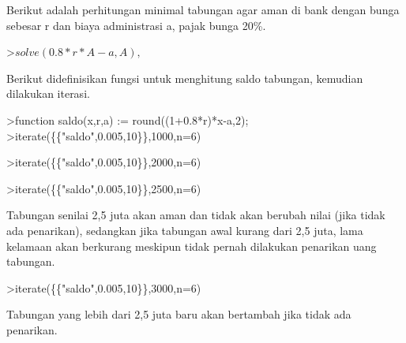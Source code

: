\documentclass[a4paper,10pt]{article}
\begin{document}
\begin{eulernotebook}
\begin{eulercomment}
\begin{eulercomment}
\begin{eulercomment}
\begin{eulercomment}
\begin{eulercomment}
\begin{eulercomment}
\begin{eulercomment}
\begin{eulercomment}
\begin{eulercomment}
\begin{eulercomment}
\begin{eulercomment}
\begin{eulercomment}
\begin{eulercomment}
\begin{eulercomment}
\begin{eulercomment}
\begin{eulercomment}
\begin{eulercomment}
Berikut adalah perhitungan minimal tabungan agar aman di bank dengan bunga sebesar r dan
biaya administrasi a, pajak bunga 20\%.
\end{eulercomment}
\begin{eulerprompt}
>$solve(0.8*r*A-a,A), $%
\end{eulerprompt}
\begin{eulercomment}
Berikut didefinisikan fungsi untuk menghitung saldo tabungan, kemudian dilakukan iterasi.
\end{eulercomment}
\begin{eulerprompt}
>function saldo(x,r,a) := round((1+0.8*r)*x-a,2);
>iterate(\{\{"saldo",0.005,10\}\},1000,n=6)
\end{eulerprompt}
\begin{euleroutput}
  [1000,  994,  987.98,  981.93,  975.86,  969.76,  963.64]
\end{euleroutput}
\begin{eulerprompt}
>iterate(\{\{"saldo",0.005,10\}\},2000,n=6)
\end{eulerprompt}
\begin{euleroutput}
  [2000,  1998,  1995.99,  1993.97,  1991.95,  1989.92,  1987.88]
\end{euleroutput}
\begin{eulerprompt}
>iterate(\{\{"saldo",0.005,10\}\},2500,n=6)
\end{eulerprompt}
\begin{euleroutput}
  [2500,  2500,  2500,  2500,  2500,  2500,  2500]
\end{euleroutput}
\begin{eulercomment}
Tabungan senilai 2,5 juta akan aman dan tidak akan berubah nilai (jika tidak ada penarikan),
sedangkan jika tabungan awal kurang dari 2,5 juta, lama kelamaan akan berkurang meskipun
tidak pernah dilakukan penarikan uang tabungan.
\end{eulercomment}
\begin{eulerprompt}
>iterate(\{\{"saldo",0.005,10\}\},3000,n=6)
\end{eulerprompt}
\begin{euleroutput}
  [3000,  3002,  3004.01,  3006.03,  3008.05,  3010.08,  3012.12]
\end{euleroutput}
\begin{eulercomment}
Tabungan yang lebih dari 2,5 juta baru akan bertambah jika tidak ada penarikan.


\end{eulercomment}
\end{eulercomment}
\end{eulercomment}
\end{eulercomment}
\end{eulercomment}
\end{eulercomment}
\end{eulercomment}
\end{eulercomment}
\end{eulercomment}
\end{eulercomment}
\end{eulercomment}
\end{eulercomment}
\end{eulercomment}
\end{eulercomment}
\end{eulercomment}
\end{eulercomment}
\end{eulercomment}
\end{eulernotebook}
\end{document}
